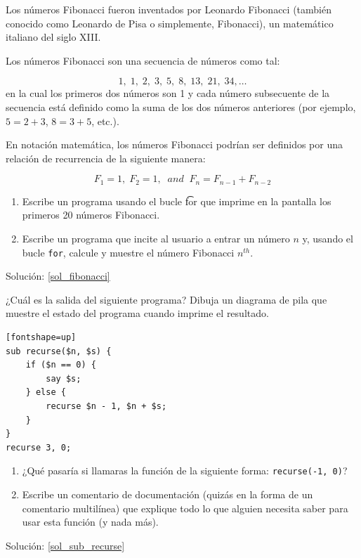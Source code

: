 \begin{exercise} 
\label{fibonacci}
Los números Fibonacci fueron inventados por Leonardo Fibonacci 
(también conocido como Leonardo de Pisa o simplemente, Fibonacci), 
un matemático italiano del siglo XIII.

Los números Fibonacci son una secuencia de números como tal:

\[1, \;1, \;2, \;3, \;5, \;8, \;13, \;21, \;34, \ldots\]
%
en la cual los primeros dos números son 1 y cada número 
subsecuente de la secuencia está definido como la suma de
los dos números anteriores (por ejemplo, $5 = 2 + 3$, $8 = 3 + 5$, etc.).

En notación matemática, los números Fibonacci 
podrían ser definidos por una relación de recurrencia  
de la siguiente manera:

\[F_1 = 1, \;F_2 = 1, \;\;and\;\;  F_n = F_{n-1} + F_{n-2} \]
%
\begin{enumerate}

\item  Escribe un programa usando el bucle {\t for} que imprime
en la pantalla los primeros 20 números Fibonacci.

\item Escribe un programa que incite al usuario a entrar un número $n$ y,
usando el bucle {\tt for}, calcule y muestre el número Fibonacci $n^{th}$.
\end{enumerate}

Solución: \ref{sol_fibonacci}


\end{exercise}

\begin{exercise}
\label{sub_recurse}

¿Cuál es la salida del siguiente programa?
Dibuja un diagrama de pila que muestre el estado del 
programa cuando imprime el resultado.

\begin{verbatim}[fontshape=up]
sub recurse($n, $s) {
    if ($n == 0) {
        say $s;
    } else {
        recurse $n - 1, $n + $s;
    }
}
recurse 3, 0;
\end{verbatim}

\begin{enumerate}

\item ¿Qué pasaría si llamaras la función de la siguiente forma:
{\tt recurse(-1, 0)}?

\item Escribe un comentario de documentación (quizás en la forma de un comentario multilínea) que explique todo lo que alguien necesita saber para usar esta función (y nada más).
\end{enumerate}

Solución: \ref{sol_sub_recurse}

\end{exercise}


